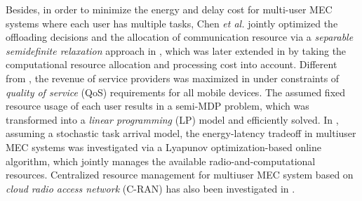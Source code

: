 \documentclass[journal]{IEEEtran}
\begin{document}
 Besides, in order to minimize the energy and delay cost for multi-user MEC systems where each user has multiple tasks, Chen \emph{et al.} jointly optimized the offloading decisions and the allocation of communication resource via a \emph{separable semidefinite relaxation} approach in \cite{MHChen1605}, which was later extended in \cite{MHChen1704} by taking the computational resource allocation and processing cost into account. Different from \cite{you2016energy,barbarossa2013joint,PLorenzo1603,MHChen1605,ren2017latency,MHChen1704}, the revenue of service providers was maximized in \cite{hoang2012optimal} under constraints of \emph{quality of service} (QoS) requirements for all mobile devices. The assumed fixed resource usage of each user results in a semi-MDP problem, which was transformed into a \emph{linear programming} (LP) model and efficiently solved. In \cite{YMao1612GC},  assuming a stochastic task arrival model, the energy-latency tradeoff in multiuser MEC systems was investigated via a Lyapunov optimization-based online algorithm, which jointly manages the available radio-and-computational resources. Centralized resource management for multiuser MEC system based on \emph{cloud radio access network} (C-RAN) has also been investigated in \cite{KWang16TCC}.
\end{document}

